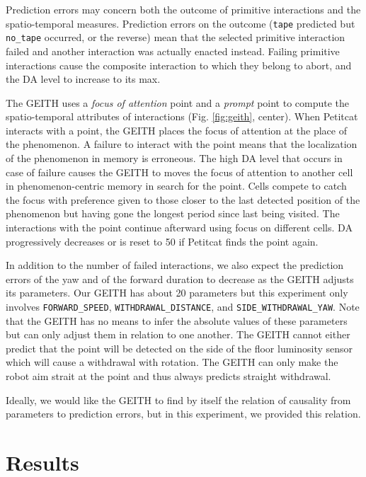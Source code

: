 \documentclass[runningheads]{llncs}
\begin{document}
Prediction errors may concern both the outcome of primitive interactions and the spatio-temporal measures.
Prediction errors on the outcome (\texttt{tape} predicted but \texttt{no\_tape} occurred, or the reverse) mean that the selected primitive interaction failed and another interaction was actually enacted instead. 
Failing primitive interactions cause the composite interaction to which they belong to abort, and the DA level to increase to its max.

The GEITH uses a \textit{focus of attention} point and a \textit{prompt} point to compute the spatio-temporal attributes of interactions (Fig. \ref{fig:geith}, center). 
When Petitcat interacts with a point, the GEITH places the focus of attention at the place of the phenomenon. 
A failure to interact with the point means that the localization of the phenomenon in memory is erroneous. 
The high DA level that occurs in case of failure causes the GEITH to moves the focus of attention to another cell in phenomenon-centric memory in search for the point.
Cells compete to catch the focus with preference given to those closer to the last detected position of the phenomenon but having gone the longest period since last being visited.
The interactions with the point continue afterward using focus on different cells. 
DA progressively decreases or is reset to 50 if Petitcat finds the point again. 

In addition to the number of failed interactions, we also expect the prediction errors of the yaw and of the forward duration to decrease as the GEITH adjusts its parameters. 
Our GEITH has about 20 parameters but this experiment only involves \texttt{FORWARD\_SPEED}, \texttt{WITHDRAWAL\_DIS\-TANCE}, and \texttt{SIDE\_WITH\-DRA\-WAL\_YAW}.
Note that the GEITH has no means to infer the absolute values of these parameters but can only adjust them in relation to one another.
The GEITH cannot either predict that the point will be detected on the side of the floor luminosity sensor which will cause a withdrawal with rotation. The GEITH can only make the robot aim strait at the point and thus always predicts straight withdrawal. 

Ideally, we would like the GEITH to find by itself the relation of causality from parameters to prediction errors, but in this experiment, we provided this relation.


\section{Results}
\end{document}
